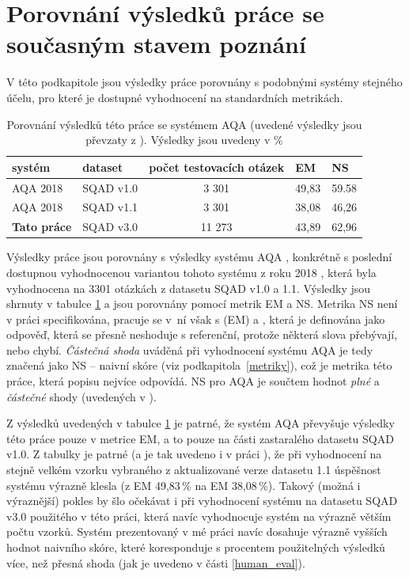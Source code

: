\section*{Porovnání výsledků práce se současným stavem poznání}
V této podkapitole jsou výsledky práce porovnány s podobnými systémy stejného účelu, pro které je dostupné vyhodnocení na standardních metrikách.\par
\begin{table}[H]
\centering
\begin{tabular}{|l|l|c||l|l|}
\hline
systém     & dataset   & počet testovacích otázek & \textbf{EM} & \textbf{NS} \\ \hline \hline
AQA 2018   & SQAD v1.0 & 3 301                    & 49,83       & 59.58       \\ \hline
AQA 2018   & SQAD v1.1 & 3 301                    & 38,08       & 46,26       \\ \hline
\textbf{Tato práce} & SQAD v3.0 & 11 273                   & 43,89       & 62,96       \\ \hline
\end{tabular}
\caption{Porovnání výsledků této práce se systémem AQA \cite{aqa} (uvedené výsledky jsou převzaty z \cite{aqa2018}). Výsledky jsou uvedeny v \%}
\label{tab:aqa_compare}
\end{table}
Výsledky práce jsou porovnány s výsledky systému AQA \cite{aqa}, konkrétně s poslední dostupnou vyhodnocenou variantou tohoto systému z roku 2018 \cite{aqa2018}, která byla vyhodnocena na 3301 otázkách z datasetu SQAD v1.0 a 1.1. Výsledky jsou shrnuty v tabulce \ref{tab:aqa_compare} a jsou porovnány pomocí metrik EM a NS. Metrika NS není v práci specifikována, pracuje se v~ní však s  (EM) a , která je definována jako odpověď, která se přesně neshoduje s referenční, protože některá slova přebývají, nebo chybí. \emph{Částečná shoda} uváděná při vyhodnocení systému AQA je tedy značená jako NS -- naivní skóre (viz podkapitola~\ref{metriky}), což je metrika této práce, která popisu nejvíce odpovídá. NS pro AQA je součtem hodnot \emph{plné} a \emph{částečné} shody (uvedených v \cite{aqa2018}).\par
Z výsledků uvedených v tabulce \ref{tab:aqa_compare} je patrné, že systém AQA převyšuje výsledky této práce pouze v metrice EM, a to pouze na části zastaralého datasetu SQAD v1.0. Z tabulky je patrné (a je tak uvedeno i v práci \cite{aqa2018}), že při vyhodnocení na stejně velkém vzorku vybraného z aktualizované verze datasetu 1.1 úspěšnost systému výrazně klesla (z EM 49,83\,\% na EM 38,08\,\%). Takový (možná i výraznější) pokles by šlo očekávat i při vyhodnocení systému na datasetu SQAD v3.0 použitého v této práci, která navíc vyhodnocuje systém na výrazně větším počtu vzorků. Systém prezentovaný v mé práci navíc dosahuje výrazně vyšších hodnot naivního skóre, které koresponduje s procentem použitelných výsledků více, než přesná shoda (jak je uvedeno v části \ref{human_eval}).\par
